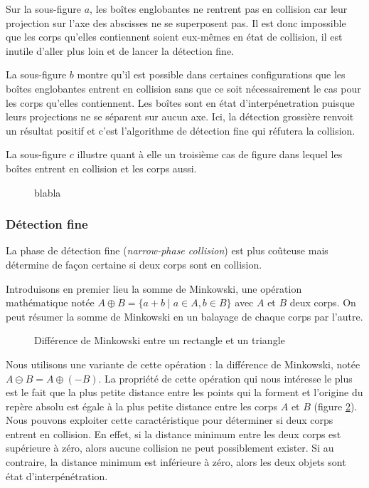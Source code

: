 Sur la sous-figure $a$, les boîtes englobantes ne rentrent pas en
collision car leur projection sur l'axe des abscisses ne se
superposent pas. Il est donc impossible que les corps qu'elles
contiennent soient eux-mêmes en état de collision, il est inutile
d'aller plus loin et de lancer la détection fine.

La sous-figure $b$ montre qu'il est possible dans certaines
configurations que les boîtes englobantes entrent en collision sans
que ce soit nécessairement le cas pour les corps qu'elles
contiennent. Les boîtes sont en état d'interpénetration puisque leurs
projections ne se séparent sur aucun axe. Ici, la détection grossière
renvoit un résultat positif et c'est l'algorithme de détection fine
qui réfutera la collision.

La sous-figure $c$ illustre quant à elle un troisième cas de figure
dans lequel les boîtes entrent en collision et les corps aussi.

\begin{figure}
  \centering
  \subfloat[]{  }
  \qquad
  \subfloat[]{  }
  \qquad
  \subfloat[]{  }
  \caption{blabla}
  \label{aabb}
\end{figure}

\subsubsection{Détection fine}

La phase de détection fine (\textit{narrow-phase collision}) est plus
coûteuse mais détermine de façon certaine si deux corps sont en
collision.

Introduisons en premier lieu la somme de Minkowski, une opération
mathématique notée $A \oplus B = \{a + b \mid a \in A, b \in B\}$ avec
$A$ et $B$ deux corps. On peut résumer la somme de Minkowski en un
balayage de chaque corps par l'autre.

\begin{figure}
  \centering
  \subfloat[]{  }
  \subfloat[]{  }
  \caption{Différence de Minkowski entre un rectangle et un triangle}
  \label{minkowski}
\end{figure}

Nous utilisons une variante de cette opération : la différence de
Minkowski, notée $A \ominus B = A \oplus (-B)$. La propriété de cette
opération qui nous intéresse le plus est le fait que la plus petite
distance entre les points qui la forment et l'origine du repère absolu
est égale à la plus petite distance entre les corps $A$ et $B$ (figure
\ref{minkowski}). Nous pouvons exploiter cette caractéristique pour
déterminer si deux corps entrent en collision. En effet, si la
distance minimum entre les deux corps est supérieure à zéro, alors
aucune collision ne peut possiblement exister. Si au contraire, la
distance minimum est inférieure à zéro, alors les deux objets sont
état d'interpénétration.

